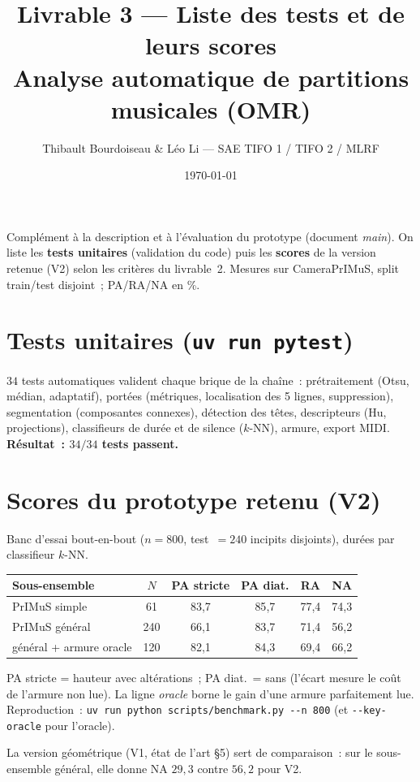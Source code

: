 \documentclass[11pt,a4paper]{article}
\title{\vspace{-1.2cm}\textbf{Livrable 3 --- Liste des tests et de leurs scores\\[2pt]
\large Analyse automatique de partitions musicales (OMR)}}
\author{\normalsize Thibault Bourdoiseau \& Léo Li --- SAE TIFO 1 / TIFO 2 / MLRF}
\date{\vspace{-8pt}\small \today}
\begin{document}
\maketitle
\vspace{-10pt}

Complément à la description et à l'évaluation du prototype (document \emph{main}). On liste les
\textbf{tests unitaires} (validation du code) puis les \textbf{scores} de la version retenue (V2) selon les
critères du livrable~2. Mesures sur CameraPrIMuS, split train/test disjoint~; PA/RA/NA en \%.

\section{Tests unitaires (\texttt{uv run pytest})}
$34$ tests automatiques valident chaque brique de la chaîne~: prétraitement (Otsu, médian, adaptatif),
portées (métriques, localisation des 5 lignes, suppression), segmentation (composantes connexes), détection
des têtes, descripteurs (Hu, projections), classifieurs de durée et de silence ($k$-NN), armure, export MIDI.
\textbf{Résultat~: $34/34$ tests passent.}

\section{Scores du prototype retenu (V2)}
Banc d'essai bout-en-bout ($n=800$, test~$=240$ incipits disjoints), durées par classifieur $k$-NN.

\begin{center}
\begin{tabular}{lccccc}
\toprule
Sous-ensemble & $N$ & PA stricte & PA diat. & RA & NA \\
\midrule
PrIMuS simple  & 61  & 83{,}7 & 85{,}7 & 77{,}4 & 74{,}3 \\
PrIMuS général & 240 & 66{,}1 & 83{,}7 & 71{,}4 & 56{,}2 \\
général + armure oracle & 120 & 82{,}1 & 84{,}3 & 69{,}4 & 66{,}2 \\
\bottomrule
\end{tabular}
\end{center}

PA stricte = hauteur avec altérations~; PA diat.\ = sans (l'écart mesure le coût de l'armure non lue). La
ligne \emph{oracle} borne le gain d'une armure parfaitement lue. Reproduction~:
\texttt{uv run python scripts/benchmark.py -{}-n 800} (et \texttt{-{}-key-oracle} pour l'oracle).

\medskip
La version géométrique (V1, état de l'art §5) sert de comparaison~: sur le sous-ensemble général, elle donne
NA $29{,}3$ contre $56{,}2$ pour V2.
\end{document}
